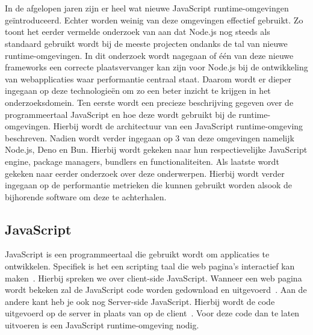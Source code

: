 \chapter{}%
\label{ch:stand-van-zaken}




In de afgelopen jaren zijn er heel wat nieuwe JavaScript runtime-omgevingen geïntroduceerd. Echter worden weinig van deze omgevingen effectief gebruikt.
Zo toont het eerder vermelde onderzoek van \textcite{Greif2022} aan dat Node.js nog steeds als standaard gebruikt wordt bij de meeste projecten 
ondanks de tal van nieuwe runtime-omgevingen.
In dit onderzoek wordt nagegaan of één van deze nieuwe frameworks
een correcte plaatsvervanger kan zijn voor Node.js bij de ontwikkeling van webapplicaties waar performantie centraal staat.
Daarom wordt er dieper ingegaan op deze technologieën om zo een beter inzicht te krijgen in het onderzoeksdomein.
Ten eerste wordt een precieze beschrijving gegeven over de programmeertaal JavaScript en hoe deze wordt gebruikt bij de runtime-omgevingen.
Hierbij wordt de architectuur van een JavaScript runtime-omgeving beschreven.
Nadien wordt verder ingegaan op 3 van deze omgevingen namelijk Node.js, Deno en Bun. 
Hierbij wordt gekeken naar hun respectievelijke JavaScript engine, package managers, bundlers en functionaliteiten.
Als laatste wordt gekeken naar eerder onderzoek over deze onderwerpen. 
Hierbij wordt verder ingegaan op de performantie metrieken die kunnen gebruikt worden alsook de bijhorende 
software om deze te achterhalen.

\section{JavaScript}
JavaScript is een programmeertaal die gebruikt wordt om applicaties te ontwikkelen. 
Specifiek is het een scripting taal die web pagina's interactief kan maken~\autocite{Mozilla2023}.
Hierbij spreken we over client-side JavaScript. Wanneer een web pagina wordt bekeken zal de JavaScript code worden 
gedownload en uitgevoerd~\autocite{JonathanBrownCFA2024}. Aan de andere kant heb je ook nog Server-side JavaScript. 
Hierbij wordt de code uitgevoerd op de server in plaats van op de client~\autocite{JonathanBrownCFA2024}. 
Voor deze code dan te laten uitvoeren is een JavaScript runtime-omgeving nodig. 

